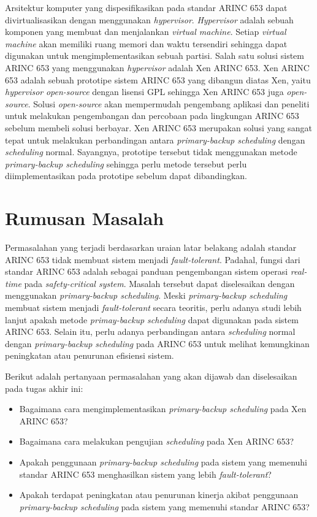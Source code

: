 Arsitektur komputer yang dispesifikasikan pada standar ARINC 653 dapat divirtualisasikan dengan menggunakan \textit{hypervisor}.
\textit{Hypervisor} adalah sebuah komponen yang membuat dan menjalankan \textit{virtual machine}.
Setiap \textit{virtual machine} akan memiliki ruang memori dan waktu tersendiri sehingga dapat digunakan untuk mengimplementasikan sebuah partisi.
Salah satu solusi sistem ARINC 653 yang menggunakan \textit{hypervisor} adalah Xen ARINC 653.
Xen ARINC 653 adalah sebuah prototipe sistem ARINC 653 yang dibangun diatas Xen, yaitu \textit{hypervisor} \textit{open-source} dengan lisensi GPL sehingga Xen ARINC 653 juga \textit{open-source}.
Solusi \textit{open-source} akan mempermudah pengembang aplikasi dan peneliti untuk melakukan pengembangan dan percobaan pada lingkungan ARINC 653 sebelum membeli solusi berbayar.
Xen ARINC 653 merupakan solusi yang sangat tepat untuk melakukan perbandingan antara \textit{primary-backup scheduling} dengan \textit{scheduling} normal.
Sayangnya, prototipe tersebut tidak menggunakan metode \textit{primary-backup scheduling} sehingga perlu metode tersebut perlu diimplementasikan pada prototipe sebelum dapat dibandingkan.

\section{Rumusan Masalah}

Permasalahan yang terjadi berdasarkan uraian latar belakang adalah standar ARINC 653 tidak membuat sistem menjadi \textit{fault-tolerant}.
Padahal, fungsi dari standar ARINC 653 adalah sebagai panduan pengembangan sistem operasi \textit{real-time} pada \textit{safety-critical system}.
Masalah tersebut dapat diselesaikan dengan menggunakan \textit{primary-backup scheduling}.
Meski \textit{primary-backup scheduling} membuat sistem menjadi \textit{fault-tolerant} secara teoritis, perlu adanya studi lebih lanjut apakah metode \textit{primay-backup scheduling} dapat digunakan pada sistem ARINC 653.
Selain itu, perlu adanya perbandingan antara \textit{scheduling} normal dengan \textit{primary-backup scheduling} pada ARINC 653 untuk melihat kemungkinan peningkatan atau penurunan efisiensi sistem.

Berikut adalah pertanyaan permasalahan yang akan dijawab dan diselesaikan pada tugas akhir ini:

\begin{itemize}
    \item Bagaimana cara mengimplementasikan \textit{primary-backup scheduling} pada Xen ARINC 653?
    \item Bagaimana cara melakukan pengujian \textit{scheduling} pada Xen ARINC 653?
    \item Apakah penggunaan \textit{primary-backup scheduling} pada sistem yang memenuhi standar ARINC 653 menghasilkan sistem yang lebih \textit{fault-tolerant}?
    \item Apakah terdapat peningkatan atau penurunan kinerja akibat penggunaan \textit{primary-backup scheduling} pada sistem yang memenuhi standar ARINC 653?
\end{itemize}

